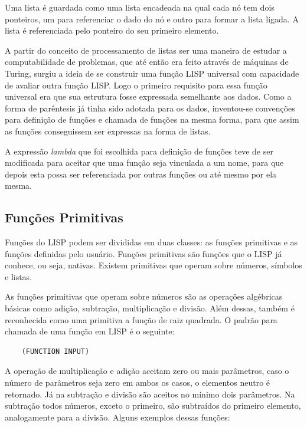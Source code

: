 \documentclass[a4paper, twoside, 12pt]{article}
\begin{document}
Uma lista é guardada como uma lista encadeada na qual cada nó tem dois ponteiros, um para referenciar o dado do nó e outro para formar a lista ligada. A lista é referenciada pelo ponteiro do seu primeiro elemento.

A partir do conceito de processamento de listas ser uma maneira de estudar a computabilidade de problemas, que até então era feito através de máquinas de Turing, surgiu a ideia de se construir uma função LISP universal com capacidade de avaliar outra função LISP. Logo o primeiro requisito para essa função universal era que sua estrutura fosse expressada semelhante aos dados. Como a forma de parêntesis já tinha sido adotada para os dados, inventou-se convenções para definição de funções e chamada de funções na mesma forma, para que assim as funções conseguissem ser expressas na forma de listas.

A expressão \textit{lambda} que foi escolhida para definição de funções teve de ser modificada para aceitar que uma função seja vinculada a um nome, para que depois esta possa ser referenciada por outras funções ou até mesmo por ela mesma.

\subsection{Funções Primitivas}

Funções do LISP podem ser divididas em duas classes: as funções primitivas e as funções definidas pelo usuário. Funções primitivas são funções que o LISP já conhece, ou seja, nativas. Existem primitivas que operam sobre números, símbolos e listas.

As funções primitivas que operam sobre números são as operações algébricas básicas como adição, subtração, multiplicação e divisão. Além dessas, também é reconhecida como uma primitiva a função de raiz quadrada. O padrão para chamada de uma função em LISP é o seguinte:

\begin{verbatim}
    (FUNCTION INPUT)
\end{verbatim}

A operação de multiplicação e adição aceitam zero ou mais parâmetros, caso o número de parâmetros seja zero em ambos os casos, o elementos neutro é retornado. Já na subtração e divisão são aceitos no mínimo dois parâmetros. Na subtração todos números, exceto o primeiro, são subtraídos do primeiro elemento, analogamente para a divisão. Alguns exemplos dessas           funções:
\end{document}
